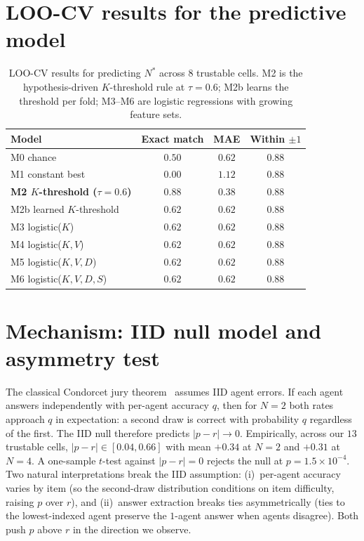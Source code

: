 \documentclass{article}
\begin{document}
\section{LOO-CV results for the predictive model}
\label{app:loo}

\begin{table}[h]
\centering
\caption{LOO-CV results for predicting $N^{*}$ across $8$ trustable cells. M2 is the hypothesis-driven $K$-threshold rule at $\tau{=}0.6$; M2b learns the threshold per fold; M3--M6 are logistic regressions with growing feature sets.}
\label{tab:loo}
\begin{tabular}{lccc}
\toprule
\textbf{Model} & \textbf{Exact match} & \textbf{MAE} & \textbf{Within $\pm 1$} \\
\midrule
M0 chance                 & $0.50$ & $0.62$ & $0.88$ \\
M1 constant best          & $0.00$ & $1.12$ & $0.88$ \\
\textbf{M2 $K$-threshold ($\tau{=}0.6$)} & $\mathbf{0.88}$ & $\mathbf{0.38}$ & $\mathbf{0.88}$ \\
M2b learned $K$-threshold & $0.62$ & $0.62$ & $0.88$ \\
M3 logistic($K$)          & $0.62$ & $0.62$ & $0.88$ \\
M4 logistic($K,V$)        & $0.62$ & $0.62$ & $0.88$ \\
M5 logistic($K,V,D$)      & $0.62$ & $0.62$ & $0.88$ \\
M6 logistic($K,V,D,S$)    & $0.62$ & $0.62$ & $0.88$ \\
\bottomrule
\end{tabular}
\end{table}


\section{Mechanism: IID null model and asymmetry test}
\label{app:mechanism-null}

The classical Condorcet jury theorem~\citep{condorcet1785} assumes IID agent errors. If each agent answers independently with per-agent accuracy $q$, then for $N{=}2$ both rates approach $q$ in expectation: a second draw is correct with probability $q$ regardless of the first. The IID null therefore predicts $|p-r| \to 0$. Empirically, across our $13$ trustable cells, $|p-r| \in [0.04, 0.66]$ with mean $+0.34$ at $N{=}2$ and $+0.31$ at $N{=}4$. A one-sample $t$-test against $|p-r|{=}0$ rejects the null at $p{=}1.5{\times}10^{-4}$. Two natural interpretations break the IID assumption: (i)~per-agent accuracy varies by item (so the second-draw distribution conditions on item difficulty, raising $p$ over $r$), and (ii)~answer extraction breaks ties asymmetrically (ties to the lowest-indexed agent preserve the $1$-agent answer when agents disagree). Both push $p$ above $r$ in the direction we observe.
\end{document}
